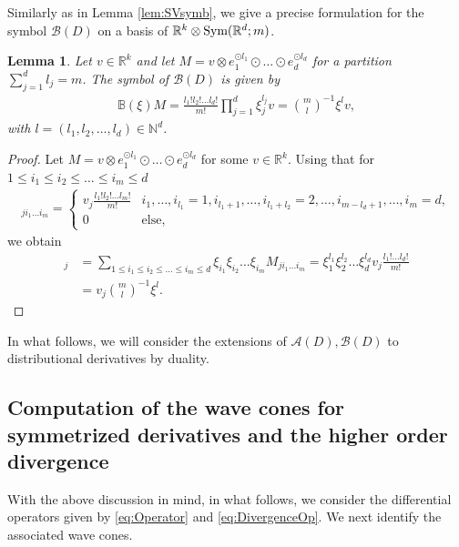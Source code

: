 \documentclass[a4paper, 10pt, twoside, notitlepage]{amsart}
\theoremstyle{plain}
\newtheorem{lem}[prop]{Lemma}
\newcommand{\R}{\mathbb{R}}
\newcommand{\A}{\mathcal{A}}
\renewcommand{\S}[1]{\textup{Sym}(\R^d;#1)}
\begin{document}
            
            Similarly as in Lemma \ref{lem:SVsymb}, we give a precise formulation for the symbol $\mathcal{B}(D)$ on a basis of $\R^k \otimes \S{m}$.
            \begin{lem}
              Let $v\in\R^k$ and let $M = v \otimes e_1^{\odot l_1} \odot \dots \odot e_d^{\odot l_d}$ for a partition $\sum_{j=1}^d l_j = m$. The symbol of $\mathcal{B}(D)$ is given by
              \begin{align*}
                \mathbb{B}(\xi)M = \frac{l_1! l_2! \dots l_d!}{m!} \prod_{j=1}^d \xi_j^{l_j} v = \binom{m}{l}^{-1} \xi^l v,
              \end{align*}
              with $l = (l_1,l_2,\dots,l_d) \in \mathbb{N}^d$.
            \end{lem}
            \begin{proof}
              Let $M = v \otimes e_1^{\odot l_1} \odot \dots \odot e_d^{\odot l_d}$ for some $v \in \R^k$. Using that for $1 \leq i_1 \leq i_2 \leq \dots \leq i_m \leq d$
              \begin{align*}
                [M]_{j i_1 \dots i_m} = \begin{cases}
                                          v_j \frac{l_1! l_2! \dots l_m!}{m!} & i_1,\dots,i_{l_1} = 1, i_{l_1+1}, \dots, i_{l_1+l_2} = 2, \dots, i_{m-l_d+1}, \dots, i_{m} = d, \\
                                          0 & \text{else,}
                                        \end{cases}
              \end{align*}
              we obtain
                        \begin{align*}
                          [\mathbb{B}(\xi)M]_j & = \sum_{1 \leq i_1 \leq i_2 \leq \dots \leq i_m \leq d} \xi_{i_1} \xi_{i_2} \dots \xi_{i_m} M_{ji_1 \dots i_m} = \xi_1^{l_1} \xi_{2}^{l_2} \dots \xi_{d}^{l_d} v_j \frac{l_1! \dots l_d!}{m!}\\
                          & = v_j \binom{m}{l}^{-1} \xi^l.
                          \end{align*}
            \end{proof}
          

          In what follows, we will consider the extensions of $\A(D), \mathcal{B}(D)$ to distributional derivatives by duality.
          
          
	\subsection{Computation of the wave cones for symmetrized derivatives and the higher order divergence}
	\label{sec:symm_deriv}
	With the above discussion in mind, in what follows, we consider the differential operators given by \eqref{eq:Operator} and \eqref{eq:DivergenceOp}.
		 We next identify the associated wave cones.
	
\end{document}
